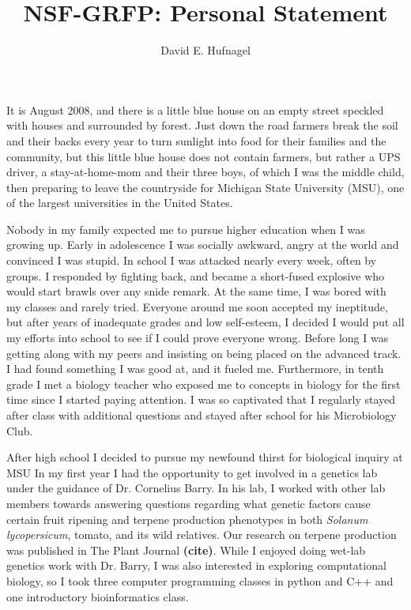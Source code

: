 \documentclass[12pt]{amsart}
\title{NSF-GRFP: Personal Statement}
\author{David E. Hufnagel}
\begin{document}
\maketitle
It is August 2008, and there is a little blue house on an empty street speckled with houses and surrounded by forest. 
Just down the road farmers break the soil and their backs every year to turn sunlight into food for their families and the community, but this little blue house does not contain farmers, but rather a UPS driver, a stay-at-home-mom and their three boys, of which I was the middle child, then preparing to leave the countryside for Michigan State University (MSU), one of the largest universities in the United States.

Nobody in my family expected me to pursue higher education when I was growing up.  
Early in adolescence I was socially awkward, angry at the world and convinced I was stupid.  
In school I was attacked nearly every week, often by groups.  
I responded by fighting back, and became a short-fused explosive who would start brawls over any snide remark.
At the same time, I was bored with my classes and rarely tried.  
Everyone around me soon accepted my ineptitude, but after years of inadequate grades and low self-esteem, I decided I would put all my efforts into school to see if I could prove everyone wrong.  
Before long I was getting along with my peers and insisting on being placed on the advanced track.  
I had found something I was good at, and it fueled me.  
Furthermore, in tenth grade I met a biology teacher who exposed me to concepts in biology for the first time since I started paying attention.  
I was so captivated that I regularly stayed after class with additional questions and stayed after school for his Microbiology Club.  

After high school I decided to pursue my newfound thirst for biological inquiry at MSU
In my first year I had the opportunity to get involved in a genetics lab under the guidance of Dr. Cornelius Barry. 
In his lab, I worked with other lab members towards answering questions regarding what genetic factors cause certain fruit ripening and terpene production phenotypes in both  \textit{Solanum lycopersicum}, tomato, and its wild relatives.  
Our research on terpene production was published in The Plant Journal \textbf{(cite)}.  
While I enjoyed doing wet-lab genetics work with Dr. Barry, I was also interested in exploring computational biology, so I took three computer programming classes in python and C++ and one introductory bioinformatics class.
\end{document}

